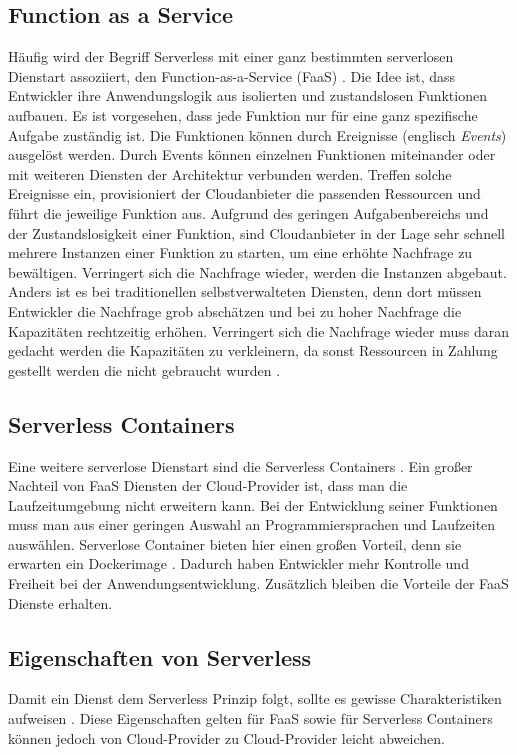 \subsection{Function as a Service}
Häufig wird der Begriff Serverless mit einer ganz bestimmten serverlosen Dienstart
assoziiert, den Function-as-a-Service (FaaS) \cite{ServerlessTrends}.
Die Idee ist, dass Entwickler ihre Anwendungslogik aus isolierten und 
zustandslosen Funktionen aufbauen.
Es ist vorgesehen, dass jede Funktion nur für eine
ganz spezifische Aufgabe zuständig ist. Die Funktionen können
durch Ereignisse (englisch \emph{Events}) ausgelöst werden.
Durch Events können einzelnen Funktionen miteinander oder mit
weiteren Diensten der Architektur verbunden werden. 
Treffen solche Ereignisse ein, provisioniert der
Cloudanbieter die passenden Ressourcen und führt die jeweilige Funktion aus.
Aufgrund des geringen Aufgabenbereichs und der Zustandslosigkeit einer Funktion,
sind Cloudanbieter in der Lage sehr schnell mehrere Instanzen einer Funktion zu starten,
um eine erhöhte Nachfrage zu bewältigen.
Verringert sich die Nachfrage wieder, werden die Instanzen abgebaut. Anders ist 
es bei traditionellen selbstverwalteten Diensten, denn dort müssen Entwickler die Nachfrage grob
abschätzen und bei zu hoher Nachfrage die Kapazitäten rechtzeitig
erhöhen. Verringert sich die Nachfrage wieder muss daran
gedacht werden die Kapazitäten zu verkleinern, da sonst
Ressourcen in Zahlung gestellt werden die nicht gebraucht wurden
\cite{WhatIsServerless} \cite{ServerlessTrends}.

\subsection{Serverless Containers}
Eine weitere serverlose Dienstart sind die Serverless Containers \cite{ServerlessContainers}.
Ein großer Nachteil von FaaS Diensten der Cloud-Provider ist,
dass man die Laufzeitumgebung nicht erweitern kann. Bei der
Entwicklung seiner Funktionen muss man aus einer geringen Auswahl
an Programmiersprachen und Laufzeiten auswählen. Serverlose Container
bieten hier einen großen Vorteil, denn sie erwarten ein Dockerimage \cite{ServerlessContainers}.
Dadurch haben Entwickler mehr Kontrolle und Freiheit bei der
Anwendungsentwicklung. Zusätzlich bleiben 
die Vorteile der FaaS Dienste erhalten.

\subsection{Eigenschaften von Serverless}
Damit ein Dienst dem Serverless Prinzip folgt, sollte es
gewisse Charakteristiken aufweisen \cite{ShafKhonMou}. Diese Eigenschaften gelten
für FaaS sowie für Serverless Containers können jedoch von Cloud-Provider zu
Cloud-Provider leicht abweichen.

